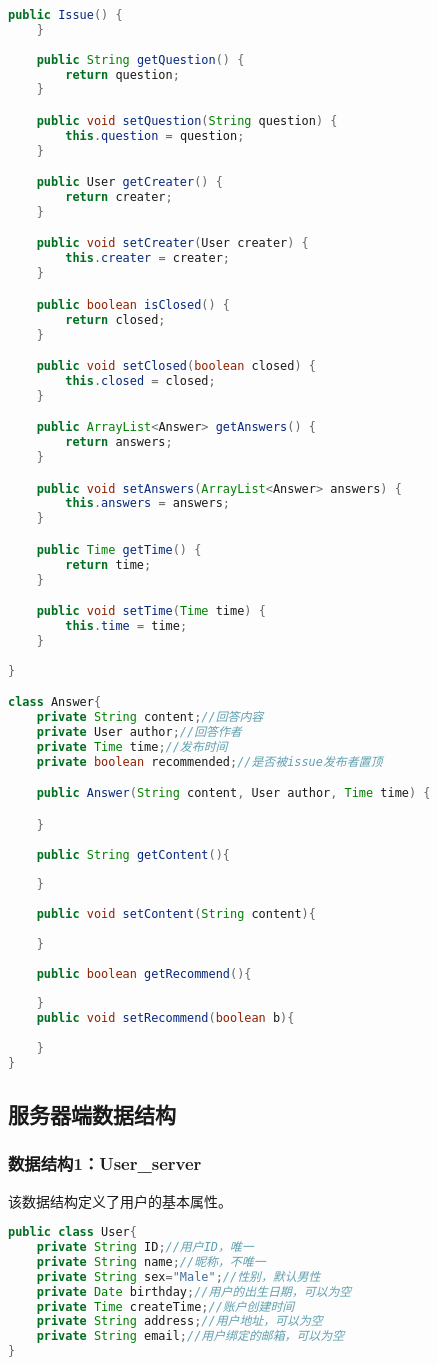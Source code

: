 {\begin{lstlisting}[language=Java, caption=Issue定义]
    public Issue() {
    }
    
    public String getQuestion() {
        return question;
    }

    public void setQuestion(String question) {
        this.question = question;
    }

    public User getCreater() {
        return creater;
    }

    public void setCreater(User creater) {
        this.creater = creater;
    }

    public boolean isClosed() {
        return closed;
    }

    public void setClosed(boolean closed) {
        this.closed = closed;
    }

    public ArrayList<Answer> getAnswers() {
        return answers;
    }

    public void setAnswers(ArrayList<Answer> answers) {
        this.answers = answers;
    }

    public Time getTime() {
        return time;
    }

    public void setTime(Time time) {
        this.time = time;
    }
    
}

class Answer{
    private String content;//回答内容
    private User author;//回答作者
    private Time time;//发布时间
    private boolean recommended;//是否被issue发布者置顶

    public Answer(String content, User author, Time time) {

    }
    
    public String getContent(){
    
    }
    
    public void setContent(String content){
    
    }
    
    public boolean getRecommend(){
        
    }
    public void setRecommend(boolean b){
        
    }
}
\end{lstlisting}


}





\subsection{服务器端数据结构}
\subsubsection{数据结构1：User\_server}
该数据结构定义了用户的基本属性。
\begin{lstlisting}[language=Java, caption=User定义]
public class User{
    private String ID;//用户ID，唯一
    private String name;//昵称，不唯一
    private String sex="Male";//性别，默认男性
    private Date birthday;//用户的出生日期，可以为空
    private Time createTime;//账户创建时间
    private String address;//用户地址，可以为空
    private String email;//用户绑定的邮箱，可以为空
}
\end{lstlisting}

